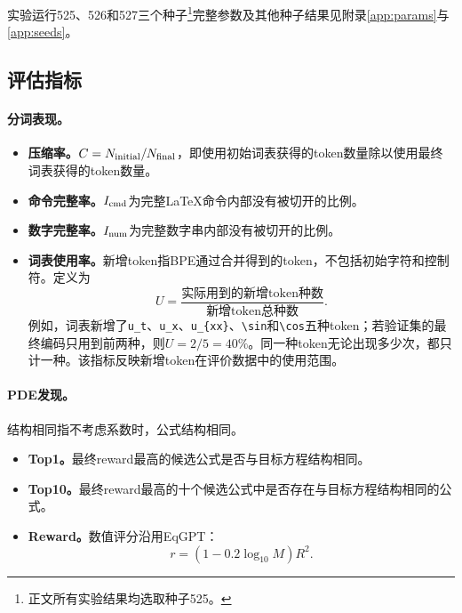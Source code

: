 \documentclass[UTF8,fontset=mac,11pt,letterpaper]{ctexart}
\begin{document}
实验运行525、526和527三个种子\footnote{正文所有实验结果均选取种子525。}完整参数及其他种子结果见附录\ref{app:params}与\ref{app:seeds}。

\subsection{评估指标}
\paragraph{分词表现。}
\begin{itemize}\setlength{\itemsep}{2pt}\setlength{\parsep}{0pt}
\item \textbf{压缩率。}$C=N_{\rm initial}/N_{\rm final}$，即使用初始词表获得的token数量除以使用最终词表获得的token数量。
\item \textbf{命令完整率。}$I_{\rm cmd}$为完整LaTeX命令内部没有被切开的比例。
\item \textbf{数字完整率。}$I_{\rm num}$为完整数字串内部没有被切开的比例。
\item \textbf{词表使用率。}新增token指BPE通过合并得到的token，不包括初始字符和控制符。定义为
\begin{equation}
 U=\frac{\text{实际用到的新增token种数}}{\text{新增token总种数}}.
\end{equation}
例如，词表新增了\verb|u_t|、\verb|u_x|、\verb|u_{xx}|、\verb|\sin|和\verb|\cos|五种token；若验证集的最终编码只用到前两种，则$U=2/5=40\%$。同一种token无论出现多少次，都只计一种。该指标反映新增token在评价数据中的使用范围。

\end{itemize}

\paragraph{PDE发现。}
结构相同指不考虑系数时，公式结构相同。
\begin{itemize}\setlength{\itemsep}{2pt}\setlength{\parsep}{0pt}
\item \textbf{Top1。}最终reward最高的候选公式是否与目标方程结构相同。
\item \textbf{Top10。}最终reward最高的十个候选公式中是否存在与目标方程结构相同的公式。
\item \textbf{Reward。}数值评分沿用EqGPT：
\begin{equation}\label{eq:reward}
 r=\left(1-0.2\log_{10}M\right)R^2.
\end{equation}
\end{itemize}
\end{document}
